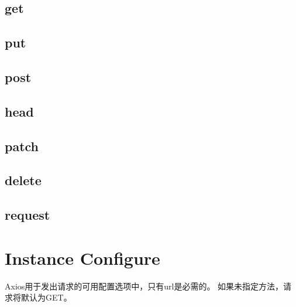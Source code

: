 \subsection{get}


\subsection{put}




\subsection{post}





\subsection{head}


\subsection{patch}


\subsection{delete}


\subsection{request}





\section{Instance Configure}

Axios用于发出请求的可用配置选项中，只有url是必需的。 如果未指定方法，请求将默认为GET。

